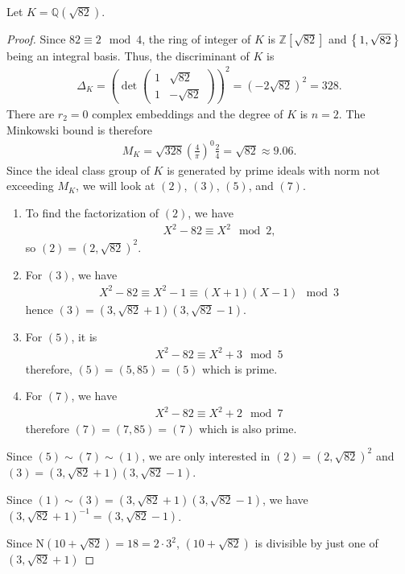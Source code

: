 \begin{example}
    Let \(K = \mathbb{Q}(\sqrt{82})\).
\end{example}
\begin{proof}
    Since \(82 \equiv 2 \mod{4}\), the ring of integer of \(K\) is \(\mathbb{Z}[\sqrt{82}]\) and \(\left\{\, 1, \sqrt{82} \,\right\}\) being an integral basis. Thus, the discriminant of \(K\) is
    \begin{align*}
        \Delta_K = \left(\det \begin{pmatrix}
            1 & \sqrt{82} \\
            1 & -\sqrt{82}
        \end{pmatrix}\right)^2
        = \left( -2 \sqrt{82} \right)^2
        = 328 \text{.}
    \end{align*}
    There are \(r_2 = 0\) complex embeddings and the degree of \(K\) is \(n = 2\). The Minkowski bound is therefore
    \begin{align*}
        M_K = \sqrt{328} \left(\frac{4}{\pi}\right)^0 \frac{2}{4} = \sqrt{82} \approx 9.06 \text{.}
    \end{align*}
    Since the ideal class group of \(K\) is generated by prime ideals with norm not exceeding \(M_K\), we will look at \((2)\), \((3)\), \((5)\), and \((7)\).
    \begin{enumerate}
        \item To find the factorization of \((2)\), we have
        \begin{align*}
            X^2 - 82 \equiv X^2 \mod{2} \text{,}
        \end{align*}
        so \((2) = (2, \sqrt{82})^2\).
        \item For \((3)\), we have
        \begin{align*}
            X^2 - 82 \equiv X^2 - 1 \equiv (X + 1) (X - 1) \mod{3}
        \end{align*}
        hence \((3) = (3, \sqrt{82} + 1) (3, \sqrt{82} - 1)\).
        \item For \((5)\), it is
        \begin{align*}
            X^2 - 82 \equiv X^2 + 3 \mod{5}
        \end{align*}
        therefore, \((5) = (5, 85) = (5)\) which is prime.
        \item For \((7)\), we have
        \begin{align*}
            X^2 - 82 \equiv X^2 + 2 \mod{7}
        \end{align*}
        therefore \((7) = (7, 85) = (7)\) which is also prime.
    \end{enumerate}
    Since \((5) \sim (7) \sim (1)\), we are only interested in \((2) = (2, \sqrt{82})^2\) and \((3) = (3, \sqrt{82} + 1)(3, \sqrt{82} - 1)\).

    Since \((1) \sim (3) = (3, \sqrt{82} + 1) (3, \sqrt{82} - 1)\), we have \((3, \sqrt{82} + 1)^{-1} = (3, \sqrt{82} - 1)\).

    Since \(\mathrm{N}(10 + \sqrt{82}) = 18 = 2 \cdot 3^2\), \((10 + \sqrt{82})\) is divisible by just one of \((3, \sqrt{82} + 1)\)
\end{proof}